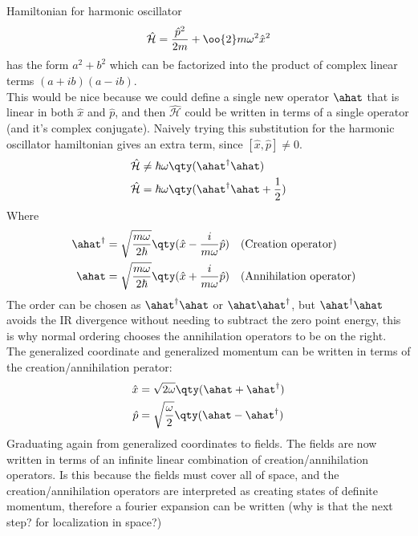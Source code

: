 \newpage Hamiltonian for harmonic oscillator 
\begin{equation}
	\hat{\mathcal{H}}=\frac{\hat{p}^2}{2m}+\oo{2}m\omega^2\hat{x}^2\label{eqn:harmonicHamiltonian}
\end{equation}
has the form \(a^2+b^2\) which can be factorized into the product of complex linear terms \((a+ib)(a-ib)\).\\ This would be nice because we could define a single new operator \(\ahat\) that is linear in both \(\hat{x}\) and \(\hat{p}\), and then \(\hat{\mathcal{H}}\) could be written in terms of a single operator (and it's complex conjugate). 
Naively trying this substitution for the harmonic oscillator hamiltonian gives an extra term, since \([\hat{x},\hat{p}]\neq0\). 
\begin{align*}
	\hat{\mathcal{H}}&\neq\hbar\omega\qty(\ahat^{\dagger}\ahat)
	\\
	\hat{\mathcal{H}}&=\hbar\omega\qty(\ahat^{\dagger}\ahat+\frac{1}{2})
\end{align*}
Where
\begin{align*}
	\quad\ahat^{\dagger}&=\sqrt{\frac{m\omega}{2\hbar}}\qty(\hat{x}-\frac{i}{m\omega}\hat{p})\quad \text{(Creation operator)}
	\\
	\quad\ahat      &=\sqrt{\frac{m\omega}{2\hbar}}\qty(\hat{x}+\frac{i}{m\omega}\hat{p})\quad \text{(Annihilation operator)}
\end{align*}
The order can be chosen as \(\ahat^{\dagger}\ahat\) or \(\ahat\ahat^{\dagger}\), but \(\ahat^{\dagger}\ahat\) avoids the IR divergence without needing to subtract the zero point energy, this is why normal ordering chooses the annihilation operators to be on the right.
\\
The generalized coordinate and generalized momentum can be written in terms of the creation/annihilation perator:
\begin{align*}
	\hat{x}&=\sqrt{2\omega}\qty(\ahat+\ahat^{\dagger})
	\\
	\hat{p}&=\sqrt{\frac{\omega}{2}}\qty(\ahat-\ahat^{\dagger})
\end{align*}
Graduating again from generalized coordinates to fields. 
The fields are now written in terms of an infinite linear combination of creation/annihilation operators. Is this because the fields must cover all of space, and the creation/annihilation operators are interpreted as creating states of definite momentum, therefore a fourier expansion can be written (why is that the next step? for localization in space?) \\
